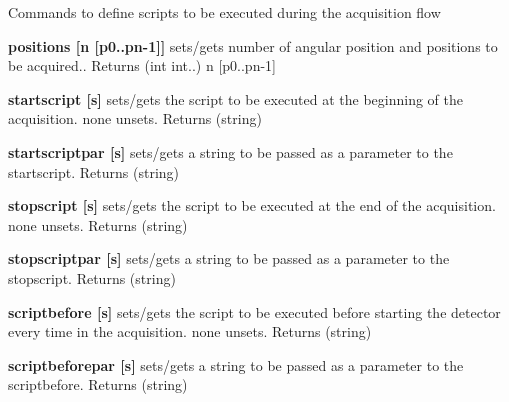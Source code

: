 Commands to define scripts to be executed during the acquisition flow


\begin{DoxyItemize}
\item {\bfseries positions \mbox{[}n \mbox{[}p0..pn-\/1\mbox{]}\mbox{]}} sets/gets number of angular position and positions to be acquired.. {\ttfamily Returns} {\ttfamily }(int int..) n \mbox{[}p0..pn-\/1\mbox{]}
\end{DoxyItemize}


\begin{DoxyItemize}
\item {\bfseries startscript \mbox{[}s\mbox{]}} sets/gets the script to be executed at the beginning of the acquisition. {\ttfamily none} unsets. {\ttfamily Returns} {\ttfamily }(string)
\end{DoxyItemize}


\begin{DoxyItemize}
\item {\bfseries startscriptpar \mbox{[}s\mbox{]}} sets/gets a string to be passed as a parameter to the startscript. {\ttfamily Returns} {\ttfamily }(string)
\end{DoxyItemize}


\begin{DoxyItemize}
\item {\bfseries stopscript \mbox{[}s\mbox{]}} sets/gets the script to be executed at the end of the acquisition. {\ttfamily none} unsets. {\ttfamily Returns} {\ttfamily }(string)
\end{DoxyItemize}


\begin{DoxyItemize}
\item {\bfseries stopscriptpar \mbox{[}s\mbox{]}} sets/gets a string to be passed as a parameter to the stopscript. {\ttfamily Returns} {\ttfamily }(string)
\end{DoxyItemize}


\begin{DoxyItemize}
\item {\bfseries scriptbefore \mbox{[}s\mbox{]}} sets/gets the script to be executed before starting the detector every time in the acquisition. {\ttfamily none} unsets. {\ttfamily Returns} {\ttfamily }(string)
\end{DoxyItemize}


\begin{DoxyItemize}
\item {\bfseries scriptbeforepar \mbox{[}s\mbox{]}} sets/gets a string to be passed as a parameter to the scriptbefore. {\ttfamily Returns} {\ttfamily }(string)
\end{DoxyItemize}


